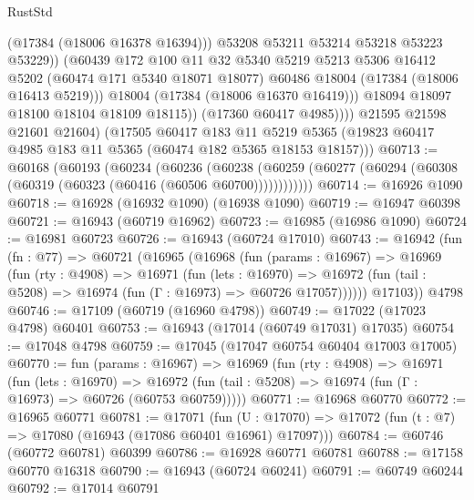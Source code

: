 \begin{lexlean}{RustStd}
\begin{coremodule}
                        (@17384 (@18006 @16378 @16394)))
                      @53208
                      @53211
                      @53214
                      @53218
                      @53223
                      @53229))
                  (@60439
                    @172
                    @100
                    @11
                    @32
                    @5340
                    @5219
                    @5213
                    @5306
                    @16412
                    @5202
                    (@60474 @171 @5340 @18071 @18077)
                    @60486
                    @18004
                    (@17384 (@18006 @16413 @5219)))
                  @18004
                  (@17384 (@18006 @16370 @16419)))
                @18094
                @18097
                @18100
                @18104
                @18109
                @18115))
            (@17360 @60417 @4985))))
      @21595
      @21598
      @21601
      @21604)
    (@17505
      @60417
      @183
      @11
      @5219
      @5365
      (@19823 @60417 @4985 @183 @11 @5365 (@60474 @182 @5365 @18153 @18157)))
@60713 := @60168
    (@60193
      (@60234
        (@60236
          (@60238 (@60259 (@60277 (@60294 (@60308 (@60319 (@60323 (@60416 (@60506 @60700))))))))))))
@60714 := @16926 @1090
@60718 := @16928 (@16932 @1090) (@16938 @1090)
@60719 := @16947 @60398
@60721 := @16943 (@60719 @16962)
@60723 := @16985 (@16986 @1090)
@60724 := @16981 @60723
@60726 := @16943 (@60724 @17010)
@60743 := @16942
    (fun (fn : @77) =>
    @60721
      (@16965
        (@16968
          (fun (params : @16967) =>
          @16969
            (fun (rty : @4908) =>
            @16971
              (fun (lets : @16970) =>
              @16972 (fun (tail : @5208) => @16974 (fun (Γ : @16973) => @60726 @17057))))))
        @17103))
    @4798
@60746 := @17109 (@60719 (@16960 @4798))
@60749 := @17022 (@17023 @4798) @60401
@60753 := @16943 (@17014 (@60749 @17031) @17035)
@60754 := @17048 @4798
@60759 := @17045 (@17047 @60754 @60404 @17003 @17005)
@60770 := fun (params : @16967) =>
  @16969
    (fun (rty : @4908) =>
    @16971
      (fun (lets : @16970) =>
      @16972 (fun (tail : @5208) => @16974 (fun (Γ : @16973) => @60726 (@60753 @60759)))))
@60771 := @16968 @60770
@60772 := @16965 @60771
@60781 := @17071
    (fun (U : @17070) => @17072 (fun (t : @7) => @17080 (@16943 (@17086 @60401 @16961) @17097)))
@60784 := @60746 (@60772 @60781) @60399
@60786 := @16928 @60771 @60781
@60788 := @17158 @60770 @16318
@60790 := @16943 (@60724 @60241)
@60791 := @60749 @60244
@60792 := @17014 @60791

\end{coremodule}
\end{lexlean}
